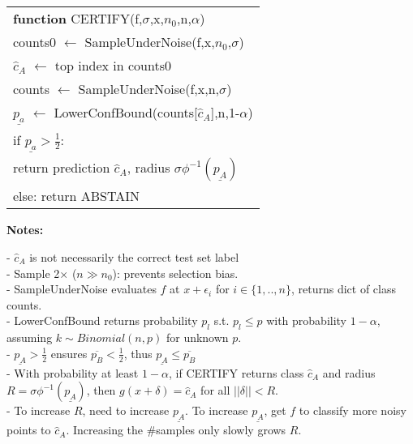 \documentclass[11pt,landscape,a4paper,fleqn]{article}
\begin{document}
\begin{multicols*}{4}
\begin{tabular}{l}
\hline 
\textbf{function} CERTIFY(f,$\sigma$,x,$n_0$,n,$\alpha$) \hfill \\
\-\hspace{3mm} counts0 $\leftarrow$ SampleUnderNoise(f,x,$n_0$,$\sigma$) \hfill \\
\-\hspace{3mm} $\hat{c}_A$ $\leftarrow$ top index in counts0 \hfill \\
\-\hspace{3mm} counts $\leftarrow$ SampleUnderNoise(f,x,n,$\sigma$) \hfill \\
\-\hspace{3mm} $\underline{p_a}$ $\leftarrow$ LowerConfBound(counts[$\hat{c}_A$],n,1-$\alpha$) \hfill \\
\-\hspace{3mm} if $\underline{p_a} > \frac{1}{2}$: \hfill \\
\-\hspace*{6mm} return prediction $\hat{c}_A$, radius $\sigma \phi^{-1}(\underline{p_A})$ \hfill \\
\-\hspace{3mm} else: return ABSTAIN \hfill \\
\hline 
\end{tabular} 



\textbf{Notes:}

- $\hat{c}_A$ is not necessarily the correct test set label\\
- Sample 2$\times$ ($n \gg n_0$): prevents selection bias.\\
- SampleUnderNoise evaluates $f$ at $x + \epsilon_i$ for $i \in \{1,..,n\}$, returns dict of class counts.\\
- LowerConfBound returns probability $p_l$ s.t. $p_l \leq p$ with probability $1 - \alpha$, assuming $k \sim Binomial(n,p)$ for unknown $p$.\\
- $\underline{p_A} > \frac{1}{2}$ ensures $\overline{p_B} < \frac{1}{2}$, thus $\underline{p_A} \leq \overline{p_B}$\\
- With probability at least $1 - \alpha$, if CERTIFY returns class $\hat{c}_A$ and radius $R = \sigma \phi^{-1}(\underline{p_A})$, then $g(x+\delta) = \hat{c}_A$ for all $||\delta|| < R$.\\
- To increase $R$, need to increase $\underline{p_A}$. To increase $\underline{p_A}$, get $f$ to classify more noisy points to $\hat{c}_A$. Increasing the \#samples only slowly grows $R$.


\end{multicols*}
\end{document}
